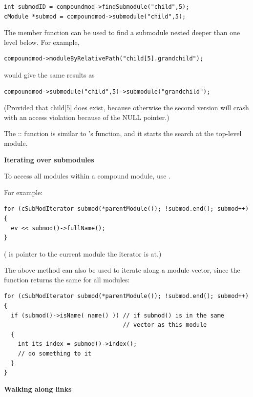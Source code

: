 \begin{Verbatim}
int submodID = compoundmod->findSubmodule("child",5);
cModule *submod = compoundmod->submodule("child",5);
\end{Verbatim}


The  member function can be used to find 
a submodule nested deeper than one level below. For example,

\begin{Verbatim}
compoundmod->moduleByRelativePath("child[5].grandchild");
\end{Verbatim}

would give the same results as

\begin{Verbatim}
compoundmod->submodule("child",5)->submodule("grandchild");
\end{Verbatim}

(Provided that child[5] does exist, because otherwise the second 
version will crash with an access violation because of the NULL 
pointer.)


The :: function is similar
to 's  function, and it
starts the search at the top-level module.


\textbf{Iterating over submodules}


To access all modules within a compound module,
use .

For example:

\begin{Verbatim}
for (cSubModIterator submod(*parentModule()); !submod.end(); submod++)
{
  ev << submod()->fullName();
}
\end{Verbatim}

( is pointer to the current module the iterator is at.)


The above method can also be used to iterate along a module
vector, since the 
function returns the same for all modules:

\begin{Verbatim}
for (cSubModIterator submod(*parentModule()); !submod.end(); submod++)
{
  if (submod()->isName( name() )) // if submod() is in the same
                                  // vector as this module
  {
    int its_index = submod()->index();
    // do something to it
  }
}
\end{Verbatim}


\textbf{Walking along links}


